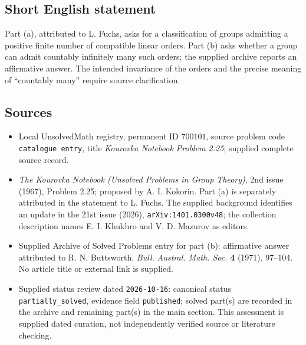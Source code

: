 \documentclass[11pt]{article}
\begin{document}
\subsection{Short English statement}
Part (a), attributed to L. Fuchs, asks for a classification of groups admitting a positive finite number of compatible linear orders. Part (b) asks whether a group can admit countably infinitely many such orders; the supplied archive reports an affirmative answer. The intended invariance of the orders and the precise meaning of ``countably many'' require source clarification.
\subsection{Sources}
\begin{itemize}
\item Local UnsolvedMath registry, permanent ID \(700101\), source problem code \texttt{catalogue entry}, title \emph{Kourovka Notebook Problem 2.25}; supplied complete source record.
\item \emph{The Kourovka Notebook (Unsolved Problems in Group Theory)}, 2nd issue (1967), Problem 2.25; proposed by A. I. Kokorin. Part (a) is separately attributed in the statement to L. Fuchs. The supplied background identifies an update in the 21st issue (2026), \texttt{arXiv:1401.0300v48}; the collection description names E. I. Khukhro and V. D. Mazurov as editors.
\item Supplied Archive of Solved Problems entry for part (b): affirmative answer attributed to R. N. Buttsworth, \emph{Bull. Austral. Math. Soc.} \textbf{4} (1971), 97--104. No article title or external link is supplied.
\item Supplied status review dated \texttt{2026-10-16}: canonical status \texttt{partially\_solved}, evidence field \texttt{published}; solved part(s) are recorded in the archive and remaining part(s) in the main section. This assessment is supplied dated curation, not independently verified source or literature checking.
\end{itemize}
\end{document}
